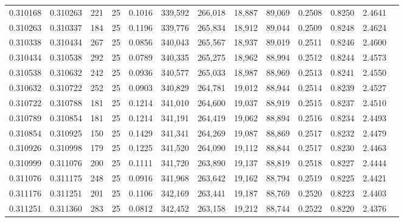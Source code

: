 \begin{tabular}{rrrrrrrrrrrrr}
0.310168 & 0.310263 &   221 &  25 &                                     0.1016 & 339,592 & 266,018 &  18,887 &  89,069 & 0.2508 & 0.8250 & 2.4641 \\
0.310263 & 0.310337 &   184 &  25 &                                     0.1196 & 339,776 & 265,834 &  18,912 &  89,044 & 0.2509 & 0.8248 & 2.4624 \\
0.310338 & 0.310434 &   267 &  25 &                                     0.0856 & 340,043 & 265,567 &  18,937 &  89,019 & 0.2511 & 0.8246 & 2.4600 \\
0.310434 & 0.310538 &   292 &  25 &                                     0.0789 & 340,335 & 265,275 &  18,962 &  88,994 & 0.2512 & 0.8244 & 2.4573 \\
0.310538 & 0.310632 &   242 &  25 &                                     0.0936 & 340,577 & 265,033 &  18,987 &  88,969 & 0.2513 & 0.8241 & 2.4550 \\
0.310632 & 0.310722 &   252 &  25 &                                     0.0903 & 340,829 & 264,781 &  19,012 &  88,944 & 0.2514 & 0.8239 & 2.4527 \\
0.310722 & 0.310788 &   181 &  25 &                                     0.1214 & 341,010 & 264,600 &  19,037 &  88,919 & 0.2515 & 0.8237 & 2.4510 \\
0.310789 & 0.310854 &   181 &  25 &                                     0.1214 & 341,191 & 264,419 &  19,062 &  88,894 & 0.2516 & 0.8234 & 2.4493 \\
0.310854 & 0.310925 &   150 &  25 &                                     0.1429 & 341,341 & 264,269 &  19,087 &  88,869 & 0.2517 & 0.8232 & 2.4479 \\
0.310926 & 0.310998 &   179 &  25 &                                     0.1225 & 341,520 & 264,090 &  19,112 &  88,844 & 0.2517 & 0.8230 & 2.4463 \\
0.310999 & 0.311076 &   200 &  25 &                                     0.1111 & 341,720 & 263,890 &  19,137 &  88,819 & 0.2518 & 0.8227 & 2.4444 \\
0.311076 & 0.311175 &   248 &  25 &                                     0.0916 & 341,968 & 263,642 &  19,162 &  88,794 & 0.2519 & 0.8225 & 2.4421 \\
0.311176 & 0.311251 &   201 &  25 &                                     0.1106 & 342,169 & 263,441 &  19,187 &  88,769 & 0.2520 & 0.8223 & 2.4403 \\
0.311251 & 0.311360 &   283 &  25 &                                     0.0812 & 342,452 & 263,158 &  19,212 &  88,744 & 0.2522 & 0.8220 & 2.4376 \\

\end{tabular}
